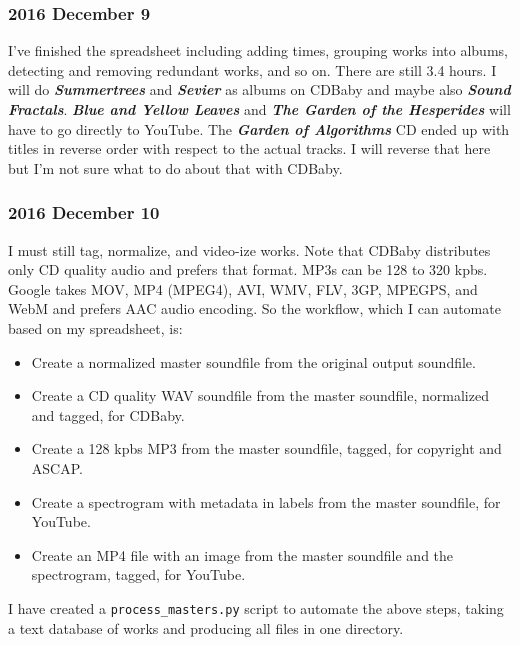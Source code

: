 \documentclass[english,11pt,letterpaper,onecolumn]{scrartcl}
\begin{document}
\subsubsection{2016 December 9}

I've finished the spreadsheet including adding times, grouping works into albums, detecting and removing redundant works, and so on. There are still 3.4 hours. I will do \emph{\textbf{Summertrees}} and \emph{\textbf{Sevier}} as albums on CDBaby and maybe also \emph{\textbf{Sound Fractals}}. \emph{\textbf{Blue and Yellow Leaves}} and \emph{\textbf{The Garden of the Hesperides}} will have to go directly to YouTube. The \emph{\textbf{Garden of Algorithms}} CD ended up with titles in reverse order with respect to the actual tracks. I will reverse that here but I'm not sure what to do about that with CDBaby.

\subsubsection*{2016 December 10}

I must still tag, normalize, and video-ize works. Note that CDBaby distributes only CD quality audio and prefers that format. MP3s can be 128 to 320 kpbs. Google takes MOV, MP4 (MPEG4), AVI, WMV, FLV, 3GP, MPEGPS, and WebM and prefers AAC audio encoding. So the workflow, which I can automate based on my spreadsheet, is:

\begin{itemize}
	\item Create a normalized master soundfile from the original output soundfile.
	\item Create a CD quality WAV soundfile from the master soundfile, normalized and tagged, for CDBaby. 
	\item Create a 128 kpbs MP3 from the master soundfile, tagged, for copyright and ASCAP.
	\item Create a spectrogram with metadata in labels from the master soundfile, for YouTube.
	\item Create an MP4 file with an image from the master soundfile and the spectrogram, tagged, for YouTube.
\end{itemize}

\noindent I have created a \texttt{process\_masters.py} script to automate the above steps, taking a text database of works and producing all files in one directory.
\end{document}
